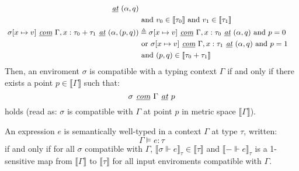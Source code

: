\begin{definition}
\begin{equation}
\begin{small}
\begin{aligned}[c]
      \textit{ \underline{at} } (\alpha, q) \\
      &\text{ and } v_0 \in \llbracket \tau_0 \rrbracket \text{ and } v_1 \in
      \llbracket \tau_1 \rrbracket \\
      \sigma[x \mapsto v] \textit{ \underline{com} } \Gamma, x : \tau_0 + \tau_1
      \textit{ \underline{at} } (\alpha, (p, q)) &\triangleq
      \sigma[x \mapsto v] \textit{ \underline{com} } \Gamma, x : \tau_0 \textit{
        \underline{at} } (\alpha, q) \text{ and } p = 0 \\
      & \text{ or } \sigma[x \mapsto v] \textit{ \underline{com} } \Gamma, x :
      \tau_1 \textit{ \underline{at} } (\alpha, q) \text{ and } p = 1 \\
      & \text{ and } (p, q) \in \llbracket \tau_0 + \tau_1 \rrbracket \\
    \end{aligned}
    \end{small}
  \end{equation}
  Then, an enviroment $\sigma$ is compatible with a typing context $\Gamma$ if
  and only if there exists a point $p \in \llbracket \Gamma \rrbracket$ such
  that: 
  \begin{equation}
    \sigma \textit{ \underline{com} } \Gamma \textit{ \underline{at} } p 
  \end{equation}
  holds (read as: $\sigma$ is compatible with $\Gamma$ at point $p$ in metric
  space $\llbracket \Gamma \rrbracket$).
\end{definition}


\begin{definition}
  An expression $e$ is semantically well-typed in a context $\Gamma$ at type
  $\tau$, written:
  $$\Gamma \vDash e : \tau$$
  if and only if for all $\sigma$ compatible with $\Gamma$, $\llbracket
  \sigma \Vdash e \rrbracket_{\tau} \in \llbracket \tau \rrbracket$ and
  $\llbracket - \Vdash e \rrbracket_{\tau}$ is a 1-sensitive map from
  $\llbracket \Gamma \rrbracket$ to $\llbracket \tau \rrbracket$ for all input
  enviroments compatible with $\Gamma$.
\end{definition}

